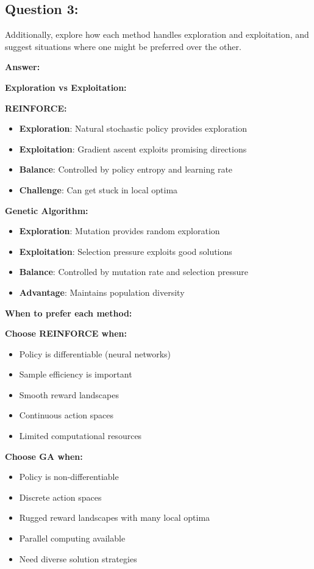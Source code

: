 \documentclass[12pt]{article}
\begin{document}
{{{\subsection{Question 3:}
Additionally, explore how each method handles exploration and exploitation, and suggest situations where one might be preferred over the other. 

\textbf{Answer:} 

\textbf{Exploration vs Exploitation:}

\textbf{REINFORCE:}
\begin{itemize}
    \item \textbf{Exploration}: Natural stochastic policy provides exploration
    \item \textbf{Exploitation}: Gradient ascent exploits promising directions
    \item \textbf{Balance}: Controlled by policy entropy and learning rate
    \item \textbf{Challenge}: Can get stuck in local optima
\end{itemize}

\textbf{Genetic Algorithm:}
\begin{itemize}
    \item \textbf{Exploration}: Mutation provides random exploration
    \item \textbf{Exploitation}: Selection pressure exploits good solutions
    \item \textbf{Balance}: Controlled by mutation rate and selection pressure
    \item \textbf{Advantage}: Maintains population diversity
\end{itemize}

\textbf{When to prefer each method:}

\textbf{Choose REINFORCE when:}
\begin{itemize}
    \item Policy is differentiable (neural networks)
    \item Sample efficiency is important
    \item Smooth reward landscapes
    \item Continuous action spaces
    \item Limited computational resources
\end{itemize}

\textbf{Choose GA when:}
\begin{itemize}
    \item Policy is non-differentiable
    \item Discrete action spaces
    \item Rugged reward landscapes with many local optima
    \item Parallel computing available
    \item Need diverse solution strategies
\end{itemize} 

}}}
\end{document}
